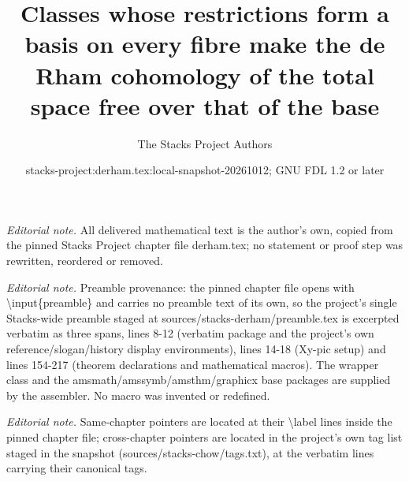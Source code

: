 \documentclass[10pt,a4paper]{amsart}
\title{Classes whose restrictions form a basis on every fibre make the de Rham cohomology of the total space free over that of the base}
\author{The Stacks Project Authors}
\date{stacks-project:derham.tex:local-snapshot-20261012; GNU FDL 1.2 or later}
\theoremstyle{plain}
\theoremstyle{definition}
\theoremstyle{remark}
\numberwithin{equation}{subsection}
\begin{document}
\maketitle
\noindent\textit{Editorial note.} All delivered mathematical text is the author's own, copied from the pinned Stacks Project chapter file derham.tex; no statement or proof step was rewritten, reordered or removed.\par\medskip
\noindent\textit{Editorial note.} Preamble provenance: the pinned chapter file opens with \textbackslash{}input\{preamble\} and carries no preamble text of its own, so the project's single Stacks-wide preamble staged at sources/stacks-derham/preamble.tex is excerpted verbatim as three spans, lines 8-12 (verbatim package and the project's own reference/slogan/history display environments), lines 14-18 (Xy-pic setup) and lines 154-217 (theorem declarations and mathematical macros). The wrapper class and the amsmath/amssymb/amsthm/graphicx base packages are supplied by the assembler. No macro was invented or redefined.\par\medskip
\noindent\textit{Editorial note.} Same-chapter pointers are located at their \textbackslash{}label lines inside the pinned chapter file; cross-chapter pointers are located in the project's own tag list staged in the snapshot (sources/stacks-chow/tags.txt), at the verbatim lines carrying their canonical tags.\par\medskip
\end{document}

